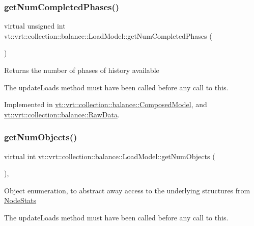 \subsubsection{\texorpdfstring{get\+Num\+Completed\+Phases()}{getNumCompletedPhases()}}
{\footnotesize\ttfamily virtual unsigned int vt\+::vrt\+::collection\+::balance\+::\+Load\+Model\+::get\+Num\+Completed\+Phases (\begin{DoxyParamCaption}{ }\end{DoxyParamCaption})\hspace{0.3cm}{\ttfamily [pure virtual]}}

Returns the number of phases of history available

The {\ttfamily update\+Loads} method must have been called before any call to this. 

Implemented in \hyperlink{classvt_1_1vrt_1_1collection_1_1balance_1_1_composed_model_a2797ee7c1b39b815fe63279a7d67ed90}{vt\+::vrt\+::collection\+::balance\+::\+Composed\+Model}, and \hyperlink{structvt_1_1vrt_1_1collection_1_1balance_1_1_raw_data_a151f3230094feacd15015f51980b8e9e}{vt\+::vrt\+::collection\+::balance\+::\+Raw\+Data}.

\mbox{\label{structvt_1_1vrt_1_1collection_1_1balance_1_1_load_model_ab4027d0849dee5b28273094cc179abd2}} 
\subsubsection{\texorpdfstring{get\+Num\+Objects()}{getNumObjects()}}
{\footnotesize\ttfamily virtual int vt\+::vrt\+::collection\+::balance\+::\+Load\+Model\+::get\+Num\+Objects (\begin{DoxyParamCaption}{ }\end{DoxyParamCaption})\hspace{0.3cm}{\ttfamily [inline]}, {\ttfamily [virtual]}}

Object enumeration, to abstract away access to the underlying structures from \hyperlink{structvt_1_1vrt_1_1collection_1_1balance_1_1_node_stats}{Node\+Stats}

The {\ttfamily update\+Loads} method must have been called before any call to this. 

